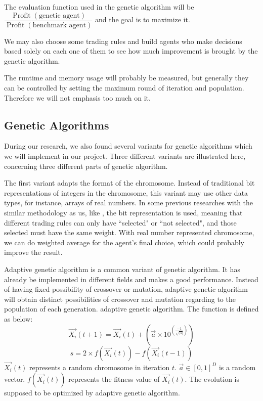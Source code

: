 \documentclass{article}
\begin{document}
The evaluation function used in the genetic algorithm will be
$\dfrac{
		\operatorname{Profit}(\text{genetic agent})
	}{
		\operatorname{Profit}(\text{benchmark agent})
	}$ and the goal is to maximize it.

We may also choose some trading rules and build agents who make decisions based solely
on each one of them to see how much improvement is brought by the genetic algorithm.

The runtime and memory usage will probably be measured,
but generally they can be controlled by setting the maximum round of iteration and population.
Therefore we will not emphasis too much on it.

\subsection{Genetic Algorithms}

During our research, we also found several variants for genetic algorithms which we will implement in our project.
Three different variants are illustrated here, concerning three different parts of genetic algorithm.

The first variant adapts the format of the chromosome.
Instead of traditional bit representations of integers in the chromosome,
this variant may use other data types, for instance, arrays of real numbers.
In some previous researches with the similar methodology as us,
like \cite{genetic-algorithms-for-predicting-the-egyptian-stock-market},
the bit representation is used, meaning that different trading rules can only have ``selected" or ``not selected",
and those selected must have the same weight.
With real number represented chromosome, we can do weighted average for the agent's final choice,
which could probably improve the result.

Adaptive genetic algorithm is a common variant of genetic algorithm.
It has already be implemented in different fields and makes a good performance.\cite{an-adaptive-genetic-algorithm-with-dominated-genes} \cite{an-adaptive-genetic-algorithm-for-crystal-structure-prediction}
Instead of having fixed possibility of crossover or mutation,
adaptive genetic algorithm will obtain distinct possibilities of crossover and mutation
regarding to the population of each generation.
adaptive genetic algorithm.\cite{a-novel-adaptive-genetic-algorithm-for-global-optimization}
The function is defined as below:
$$\overrightarrow{X_i}(t+1) = \overrightarrow{X_i}(t) + (\overrightarrow{a} \times 10^{(\frac{-1}{\sqrt{|s|}})})$$
$$s = 2 \times f(\overrightarrow{X_i}(t)) - f(\overrightarrow{X_i}(t-1))$$
$\overrightarrow{X_i}(t)$ represents a random chromosome in iteration $t$.
$\overrightarrow{a} \in [0,1]^D$ is a random vector.
$f(\overrightarrow{X_i}(t))$ represents the fitness value of $\overrightarrow{X_i}(t)$. \cite{a-novel-adaptive-genetic-algorithm-for-global-optimization}
The evolution is supposed to be optimized by adaptive genetic algorithm.
\end{document}

